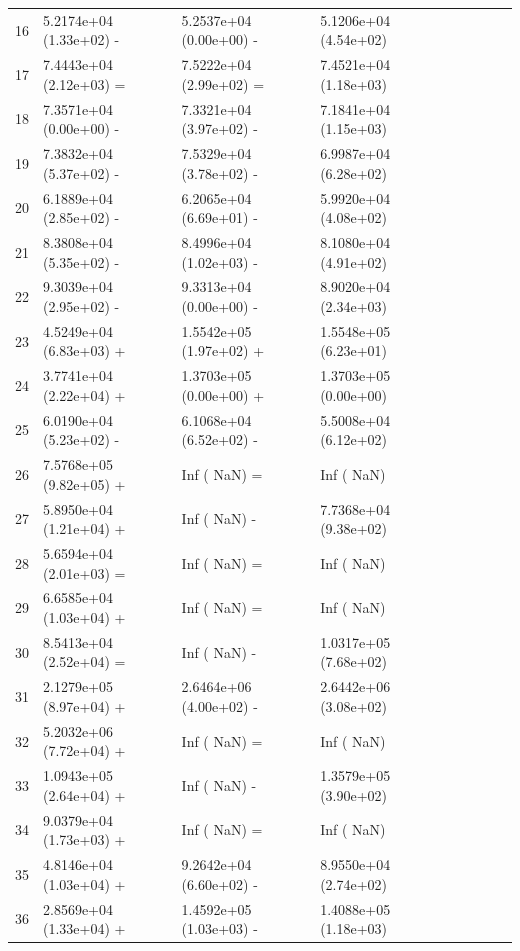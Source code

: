\documentclass[11pt]{article}
\begin{document}
\begin{table}[htbp]
{\begin{tabular}{lllllllll}
16    & 5.2174e+04 (1.33e+02) - & 5.2537e+04 (0.00e+00) - & 5.1206e+04 (4.54e+02) \\
17    & 7.4443e+04 (2.12e+03) = & 7.5222e+04 (2.99e+02) = & 7.4521e+04 (1.18e+03) \\
18    & 7.3571e+04 (0.00e+00) - & 7.3321e+04 (3.97e+02) - & 7.1841e+04 (1.15e+03) \\
19    & 7.3832e+04 (5.37e+02) - & 7.5329e+04 (3.78e+02) - & 6.9987e+04 (6.28e+02) \\
20    & 6.1889e+04 (2.85e+02) - & 6.2065e+04 (6.69e+01) - & 5.9920e+04 (4.08e+02) \\
21    & 8.3808e+04 (5.35e+02) - & 8.4996e+04 (1.02e+03) - & 8.1080e+04 (4.91e+02) \\
22    & 9.3039e+04 (2.95e+02) - & 9.3313e+04 (0.00e+00) - & 8.9020e+04 (2.34e+03) \\
23    & 4.5249e+04 (6.83e+03) + & 1.5542e+05 (1.97e+02) + & 1.5548e+05 (6.23e+01) \\
24    & 3.7741e+04 (2.22e+04) + & 1.3703e+05 (0.00e+00) + & 1.3703e+05 (0.00e+00) \\
25    & 6.0190e+04 (5.23e+02) - & 6.1068e+04 (6.52e+02) - & 5.5008e+04 (6.12e+02) \\
26    & 7.5768e+05 (9.82e+05) + & Inf (     NaN) =        & Inf (     NaN)        \\
27    & 5.8950e+04 (1.21e+04) + & Inf (     NaN) -        & 7.7368e+04 (9.38e+02) \\
28    & 5.6594e+04 (2.01e+03) = & Inf (     NaN) =        & Inf (     NaN)        \\
29    & 6.6585e+04 (1.03e+04) + & Inf (     NaN) =        & Inf (     NaN)        \\
30    & 8.5413e+04 (2.52e+04) = & Inf (     NaN) -        & 1.0317e+05 (7.68e+02) \\
31    & 2.1279e+05 (8.97e+04) + & 2.6464e+06 (4.00e+02) - & 2.6442e+06 (3.08e+02) \\
32    & 5.2032e+06 (7.72e+04) + & Inf (     NaN) =        & Inf (     NaN)        \\
33    & 1.0943e+05 (2.64e+04) + & Inf (     NaN) -        & 1.3579e+05 (3.90e+02) \\
34    & 9.0379e+04 (1.73e+03) + & Inf (     NaN) =        & Inf (     NaN)        \\
35    & 4.8146e+04 (1.03e+04) + & 9.2642e+04 (6.60e+02) - & 8.9550e+04 (2.74e+02) \\
36    & 2.8569e+04 (1.33e+04) + & 1.4592e+05 (1.03e+03) - & 1.4088e+05 (1.18e+03) \\

\end{tabular}}
\end{table}
\end{document}
